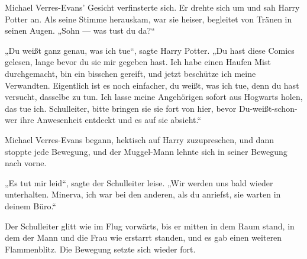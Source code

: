 Michael Verres-Evans’ Gesicht verfinsterte sich. Er drehte sich um und sah Harry Potter an. Als seine Stimme herauskam, war sie heiser, begleitet von Tränen in seinen Augen.
„Sohn — was tust du da?“

„Du weißt ganz genau, was ich tue“, sagte Harry Potter.
„Du hast diese Comics gelesen, lange bevor du sie mir gegeben hast. Ich habe einen Haufen Mist durchgemacht, bin ein bisschen gereift, und jetzt beschütze ich meine Verwandten. Eigentlich ist es noch einfacher, du weißt, was ich tue, denn du hast versucht, dasselbe zu tun. Ich lasse meine Angehörigen sofort aus Hogwarts holen, das tue ich. Schulleiter, bitte bringen sie sie fort von hier, bevor Du-weißt-schon-wer ihre Anwesenheit entdeckt und es auf sie absieht.“

Michael Verres-Evans begann, hektisch auf Harry zuzupreschen, und dann stoppte jede Bewegung, und der Muggel-Mann lehnte sich in seiner Bewegung nach vorne.

„Es tut mir leid“, sagte der Schulleiter leise.
„Wir werden uns bald wieder unterhalten. Minerva, ich war bei den anderen, als du anriefst, sie warten in deinem Büro.“


Der Schulleiter glitt wie im Flug vorwärts, bis er mitten in dem Raum stand, in dem der Mann und die Frau wie erstarrt standen, und es gab einen weiteren Flammenblitz. Die Bewegung setzte sich wieder fort.

